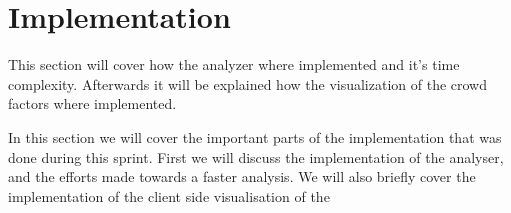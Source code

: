 \section{Implementation}
This section will cover how the analyzer where implemented and it's time complexity. Afterwards it will be explained how the visualization of the crowd factors where implemented.

In this section we will cover the important parts of the implementation that was done during this sprint. First we will discuss the implementation of the analyser, and the efforts made towards a faster analysis. We will also briefly cover the implementation of the client side visualisation of the



